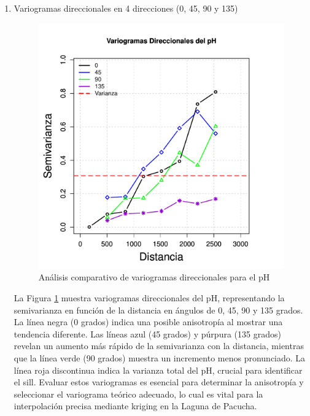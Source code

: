 \begin{enumerate}
    \item Variogramas direccionales en 4 direcciones (0, 45, 90 y 135)

\begin{figure}[!htb]
    \centering
    \includegraphics[width=0.85\linewidth]{Figuras_AED//PH/ph_Vario4DEstimation.pdf}
    \caption{Análisis comparativo de variogramas direccionales para el pH}
    \label{fig:enter-label4d}
\end{figure}

La Figura \ref{fig:enter-label4d} muestra variogramas direccionales del pH, representando la semivarianza en función de la distancia en ángulos de 0, 45, 90 y 135 grados. La línea negra (0 grados) indica una posible anisotropía al mostrar una tendencia diferente. Las líneas azul (45 grados) y púrpura (135 grados) revelan un aumento más rápido de la semivarianza con la distancia, mientras que la línea verde (90 grados) muestra un incremento menos pronunciado. La línea roja discontinua indica la varianza total del pH, crucial para identificar el sill. Evaluar estos variogramas es esencial para determinar la anisotropía y seleccionar el variograma teórico adecuado, lo cual es vital para la interpolación precisa mediante kriging en la Laguna de Pacucha.




\end{enumerate}

